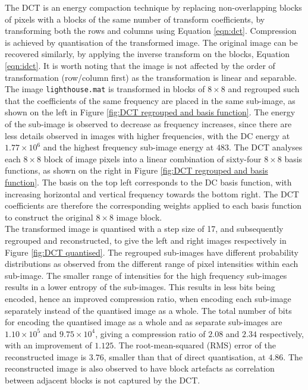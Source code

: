 The DCT is an energy compaction technique by replacing non-overlapping blocks of pixels with a blocks of the same number of transform coefficients, by transforming both the rows and columns using Equation \ref{eqn:dct}. Compression is achieved by quantisation of the transformed image. The original image can be recovered similarly, by applying the inverse transform on the blocks, Equation \ref{eqn:idct}. 
It is worth noting that the image is not affected by the order of transformation (row/column first) as the transformation is linear and separable.\\

The image \texttt{lighthouse.mat} is transformed in blocks of $8 \times 8$ and regrouped such that the coefficients of the same frequency are placed in the same sub-image, as shown on the left in Figure \ref{fig:DCT regrouped and basis function}. The energy of the sub-image is observed to decrease as frequency increases, since there are less details observed in images with higher frequencies, with the DC energy at $1.77 \times 10^6$ and the highest frequency sub-image energy at $483$. The DCT analyses each $8 \times 8$ block of image pixels into a linear combination of sixty-four $8 \times 8$ basis functions, as shown on the right in Figure \ref{fig:DCT regrouped and basis function}. The basis on the top left corresponds to the DC basis function, with increasing horizontal and vertical frequency towards the bottom right. The DCT coefficients are therefore the corresponding weights applied to each basis function to construct the original $8 \times 8$ image block.\\

The transformed image is quantised with a step size of 17, and subsequently regrouped and reconstructed, to give the left and right images respectively in Figure \ref{fig:DCT quantised}. The regrouped sub-images have different probability distributions as observed from the different range of pixel intensities within each sub-image. The smaller range of intensities for the high frequency sub-images results in a lower entropy of the sub-images. This results in less bits being encoded, hence an improved compression ratio, when encoding each sub-image separately instead of the quantised image as a whole. The total number of bits for encoding the quantised image as a whole and as separate sub-images are $1.10 \times 10^5$ and $9.75 \times 10^4$, giving a compression ratio of $2.08$ and $2.34$ respectively, with an improvement of $1.125$. The root-mean-squared (RMS) error of the reconstructed image is $3.76$, smaller than that of direct quantisation, at $4.86$. The reconstructed image is also observed to have block artefacts as correlation between adjacent blocks is not captured by the DCT.\\

